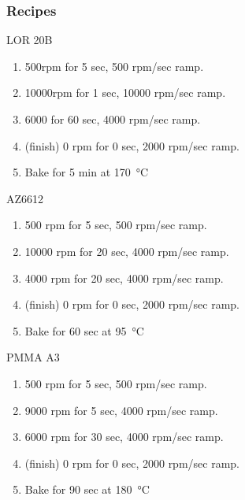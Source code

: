 \subsubsection{Recipes}
\begin{description}
\item {LOR 20B}
  \begin{enumerate}
  \item 500rpm for 5 sec, 500 rpm/sec ramp.
  \item 10000rpm for 1 sec, 10000 rpm/sec ramp.
  \item 6000 for 60 sec, 4000 rpm/sec ramp.
  \item (finish) 0 rpm for 0 sec, 2000 rpm/sec ramp.
  \item Bake for 5 min at \SI{170}{\celsius}
  \end{enumerate}
\item {AZ6612}
  \begin{enumerate}
  \item 500 rpm for 5 sec, 500 rpm/sec ramp.
  \item 10000 rpm for 20 sec, 4000 rpm/sec ramp.
  \item 4000 rpm for 20 sec, 4000 rpm/sec ramp.
  \item (finish) 0 rpm for 0 sec, 2000 rpm/sec ramp.
  \item Bake for 60 sec at \SI{95}{\celsius}
  \end{enumerate}
\item {PMMA A3}
  \begin{enumerate}
  \item 500 rpm for 5 sec, 500 rpm/sec ramp.
  \item 9000 rpm for 5 sec, 4000 rpm/sec ramp.
  \item 6000 rpm for 30 sec, 4000 rpm/sec ramp.
  \item (finish) 0 rpm for 0 sec, 2000 rpm/sec ramp.
  \item Bake for 90 sec at \SI{180}{\celsius}
  \end{enumerate}
\end{description}

